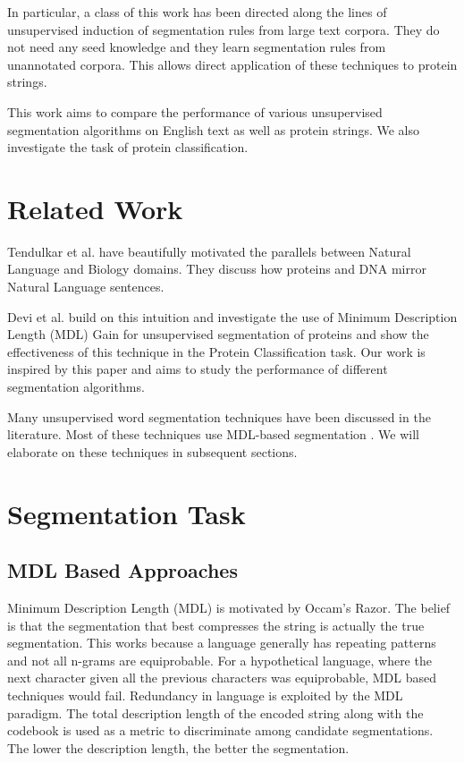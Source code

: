 \documentclass[runningheads]{llncs}
\begin{document}
In particular, a class of this work has been directed along the lines of unsupervised induction of segmentation rules from large text corpora. They do not need any seed knowledge and they learn segmentation rules from unannotated corpora. This allows direct application of these techniques to protein strings.	

This work aims to compare the performance of various unsupervised segmentation algorithms on English text as well as protein strings. We also investigate the task of protein classification. 

\section{Related Work}

Tendulkar et al. \cite{tendulkar2013parallels} have beautifully motivated the parallels between Natural Language and Biology domains. They discuss how proteins and DNA mirror Natural Language sentences. 

Devi et al. \cite{devi2017protein} build on this intuition and investigate the use of Minimum Description Length (MDL) Gain for unsupervised segmentation of proteins and show the effectiveness of this technique in the Protein Classification task. Our work is inspired by this paper and aims to study the performance of different segmentation algorithms. 

Many unsupervised word segmentation techniques have been discussed in the literature. Most of these techniques use MDL-based segmentation \cite{zhikov2013efficient,kitt1999unsupervised,hewlett2011fully,chen2013improved}. We will elaborate on these techniques in subsequent sections.

\section{Segmentation Task}

\subsection{MDL Based Approaches}

Minimum Description Length (MDL) is motivated by Occam's Razor. The belief is that the segmentation that best compresses the string is actually the true segmentation. This works because a language generally has repeating patterns and not all n-grams are equiprobable. For a hypothetical language, where the next character given all the previous characters was equiprobable, MDL based techniques would fail. Redundancy in language is exploited by the MDL paradigm. 
The total description length of the encoded string along with the codebook is used as a metric to discriminate among candidate segmentations. The lower the description length, the better the segmentation. 
\end{document}
